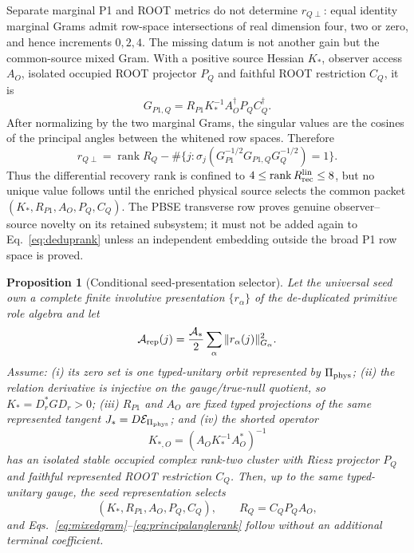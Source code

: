 \documentclass[11pt]{article}
\newtheorem{proposition}{Proposition}
\begin{document}
Separate marginal P1 and ROOT metrics do not determine $r_{Q\perp}$: equal
identity marginal Grams admit row-space intersections of real dimension four,
two or zero, and hence increments $0,2,4$.  The missing datum is not another
gain but the common-source mixed Gram.  With a positive source Hessian $K_*$,
observer access $A_O$, isolated occupied ROOT projector $P_Q$ and faithful
ROOT restriction $C_Q$, it is
\begin{equation}
G_{P1,Q}=R_{P1}K_*^{-1}A_O^\dagger P_QC_Q^\dagger.
\label{eq:mixedgram}
\end{equation}
After normalizing by the two marginal Grams, the singular values are the
cosines of the principal angles between the whitened row spaces.  Therefore
\begin{equation}
r_{Q\perp}=\operatorname{rank}R_Q
-\#\{j:\sigma_j(G_{P1}^{-1/2}G_{P1,Q}G_Q^{-1/2})=1\}.
\label{eq:principalanglerank}
\end{equation}
Thus the differential recovery rank is confined to $4\le
\operatorname{rank}R_{\rm rec}^{\rm lin}\le8$, but no unique value follows
until the enriched physical source selects the common packet
$(K_*,R_{P1},A_O,P_Q,C_Q)$.  The PBSE transverse row proves genuine
observer--source novelty on its retained subsystem; it must not be added again
to Eq.~\eqref{eq:deduprank} unless an independent embedding outside the broad
P1 row space is proved.

\begin{proposition}[Conditional seed-presentation selector]
\label{prop:seedselector}
Let the universal seed own a complete finite involutive presentation
$\{r_\alpha\}$ of the de-duplicated primitive role algebra and let
\begin{equation}
\mathcal A_{\rm rep}(j)
={\mathcal A_*\over2}\sum_\alpha
\|r_\alpha(j)\|_{G_\alpha}^2.
\label{eq:seedrepaction}
\end{equation}
Assume: (i) its zero set is one typed-unitary orbit represented by
$\Pi_{\rm phys}$; (ii) the relation derivative is injective on the
gauge/true-null quotient, so $K_*=D_r^*GD_r>0$; (iii) $R_{P1}$ and $A_O$ are
fixed typed projections of the same represented tangent
$J_*=D\mathcal E_{\Pi_{\rm phys}}$; and (iv) the shorted operator
\begin{equation}
K_{*,O}=(A_OK_*^{-1}A_O^*)^{-1}
\label{eq:shortedsource}
\end{equation}
has an isolated stable occupied complex rank-two cluster with Riesz projector
$P_Q$ and faithful represented ROOT restriction $C_Q$.  Then, up to the same
typed-unitary gauge, the seed representation selects
\begin{equation}
(K_*,R_{P1},A_O,P_Q,C_Q),
\qquad R_Q=C_QP_QA_O,
\label{eq:selectedpacket}
\end{equation}
and Eqs.~\eqref{eq:mixedgram}--\eqref{eq:principalanglerank} follow without
an additional terminal coefficient.
\end{proposition}
\end{document}
